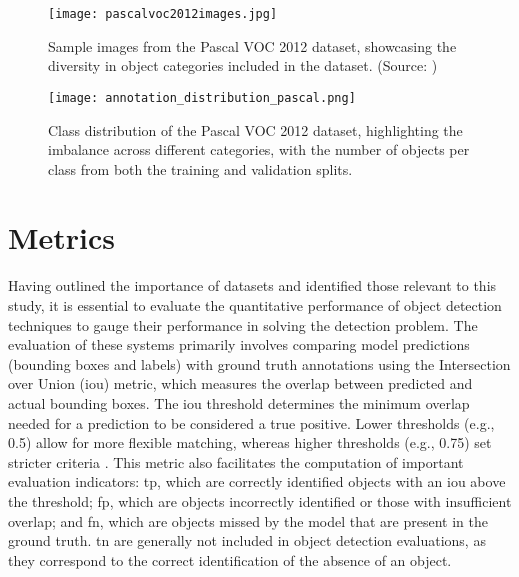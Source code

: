 \begin{figure}[!htbp]
    \centering
    \texttt{[image: pascalvoc2012images.jpg]}
    \caption{Sample images from the Pascal VOC 2012 dataset, showcasing the diversity in object categories included in the dataset. (Source: \cite{pascal-voc-2012})}
    \label{fig:pascal_voc}%
\end{figure}



\begin{figure}[!ht]
    \centering
    \texttt{[image: annotation\_distribution\_pascal.png]}
    \caption{Class distribution of the Pascal VOC 2012 dataset, highlighting the imbalance across different categories, with the number of objects per class from both the training and validation splits.}
    \label{fig:class_distribution_pascal_voc}%
\end{figure}

\section{Metrics}
\label{sec:4_metrics}

Having outlined the importance of datasets and identified those relevant to this study, it is essential to evaluate the quantitative performance of object detection techniques to gauge their performance in solving the detection problem. The evaluation of these systems primarily involves comparing model predictions (bounding boxes and labels) with ground truth annotations using the Intersection over Union (\gls{iou}) metric, which measures the overlap between predicted and actual bounding boxes. The \gls{iou} threshold determines the minimum overlap needed for a prediction to be considered a true positive. Lower thresholds (e.g., 0.5) allow for more flexible matching, whereas higher thresholds (e.g., 0.75) set stricter criteria \cite{coco}. This metric also facilitates the computation of important evaluation indicators: \gls{tp}, which are correctly identified objects with an \gls{iou} above the threshold; \gls{fp}, which are objects incorrectly identified or those with insufficient overlap; and \gls{fn}, which are objects missed by the model that are present in the ground truth. \gls{tn} are generally not included in object detection evaluations, as they correspond to the correct identification of the absence of an object.


